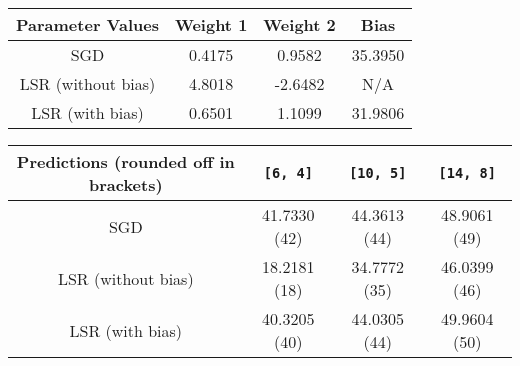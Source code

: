 \documentclass{article}
\begin{document}
\begin{center}
\begin{tabular}{|c|c|c|c|}
\hline
\textbf{Parameter Values} & \textbf{Weight 1} & \textbf{Weight 2} & \textbf{Bias} \\
\hline
SGD & 0.4175 & 0.9582 & 35.3950 \\
\hline
LSR (without bias) & 4.8018 & -2.6482 & N/A \\
\hline
LSR (with bias) & 0.6501 & 1.1099 & 31.9806 \\
\hline
\end{tabular}

\begin{tabular}{|c|c|c|c|}
\hline
\textbf{Predictions (rounded off in brackets)} & \texttt{[6, 4]} & \texttt{[10, 5]} & \texttt{[14, 8]} \\
\hline
SGD & 41.7330 (42) & 44.3613 (44) & 48.9061 (49) \\
\hline
LSR (without bias) & 18.2181 (18) & 34.7772 (35) & 46.0399 (46) \\
\hline
LSR (with bias) & 40.3205 (40) & 44.0305 (44) & 49.9604 (50) \\
\hline
\end{tabular}
\end{center}
\end{document}
